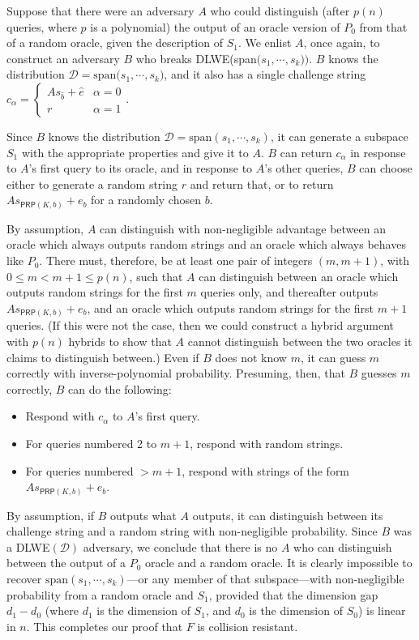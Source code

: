 \documentclass{article}
\begin{document}
\begin{itemize}
    Suppose that there were an adversary $A$ who could distinguish (after $p(n)$ queries, where $p$ is a polynomial) the output of an oracle version of $P_0$ from that of a random oracle, given the description of $S_1$. We enlist $A$, once again, to construct an adversary $B$ who breaks \textsf{DLWE}(span$\big(s_1, \cdots, s_k)\big)$. $B$ knows the distribution $\mathcal{D} = \mathrm{span}\big(s_1, \cdots, s_k\big)$, and it also has a single challenge string $c_\alpha = \begin{cases} As_{\widehat b} + \hat e & \alpha = 0 \\ r & \alpha = 1\end{cases}$.
    
    Since $B$ knows the distribution $\mathcal{D} = \mathrm{span}(s_1, \cdots, s_k)$, it can generate a subspace $S_1$ with the appropriate properties and give it to $A$. $B$ can return $c_\alpha$ in response to $A$'s first query to its oracle, and in response to $A$'s other queries, $B$ can choose either to generate a random string $r$ and return that, or to return $As_{ \textsf{PRP}(K, b)} + e_{b}$ for a randomly chosen $b$.
    
    By assumption, $A$ can distinguish with non-negligible advantage between an oracle which always outputs random strings and an oracle which always behaves like $P_0$. There must, therefore, be at least one pair of integers $(m, m+1)$, with $0 \leq m < m+1 \leq p(n)$, such that $A$ can distinguish between an oracle which outputs random strings for the first $m$ queries only, and thereafter outputs $As_{ \textsf{PRP}(K, b)} + e_{b}$, and an oracle which outputs random strings for the first $m+1$ queries. (If this were not the case, then we could construct a hybrid argument with $p(n)$ hybrids to show that $A$ cannot distinguish between the two oracles it claims to distinguish between.) Even if $B$ does not know $m$, it can guess $m$ correctly with inverse-polynomial probability. Presuming, then, that $B$ guesses $m$ correctly, $B$ can do the following:
    \begin{itemize}
        \item Respond with $c_\alpha$ to $A$'s first query.
        \item For queries numbered 2 to $m+1$, respond with random strings.
        \item For queries numbered $> m+1$, respond with strings of the form $As_{ \textsf{PRP}(K, b)} + e_{b}$.
    \end{itemize}
    By assumption, if $B$ outputs what $A$ outputs, it can distinguish between its challenge string and a random string with non-negligible probability. Since $B$ was a \textsf{DLWE}$(\mathcal{D})$ adversary, we conclude that there is no $A$ who can distinguish between the output of a $P_0$ oracle and a random oracle. It is clearly impossible to recover $\mathrm{span}(s_1, \cdots, s_k)$---or any member of that subspace---with non-negligible probability from a random oracle and $S_1$, provided that the dimension gap $d_1 - d_0$ (where $d_1$ is the dimension of $S_1$, and $d_0$ is the dimension of $S_0$) is linear in $n$. This completes our proof that $F$ is collision resistant.
\end{itemize}
\end{document}
